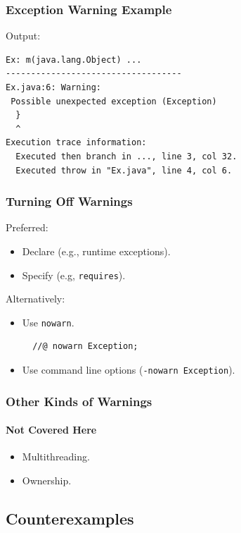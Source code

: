 \begin{frame}[fragile]
\frametitle{Exception Warning Example}

Output:
\begin{verbatim}
Ex: m(java.lang.Object) ...
-----------------------------------
Ex.java:6: Warning:
 Possible unexpected exception (Exception)
  }
  ^
Execution trace information:
  Executed then branch in ..., line 3, col 32.
  Executed throw in "Ex.java", line 4, col 6.
\end{verbatim}
\end{frame}

\begin{frame}[fragile]
\frametitle{Turning Off Warnings}

Preferred:
\begin{itemize}
\item
Declare (e.g., runtime exceptions).

\item
Specify (e.g, \lstinline!requires!).
\end{itemize}

Alternatively:
\begin{itemize}
\item
Use \lstinline!nowarn!.

\begin{lstlisting}
  //@ nowarn Exception;
\end{lstlisting}

\item
Use command line options
(\texttt{-nowarn Exception}).
\end{itemize}
\end{frame}

\begin{frame}
\frametitle{Other Kinds of Warnings}
\framesubtitle{Not Covered Here}

\begin{itemize}
\item
Multithreading.

\item
Ownership.
\end{itemize}
\end{frame}

\subsection[Info.]{Counterexamples}


